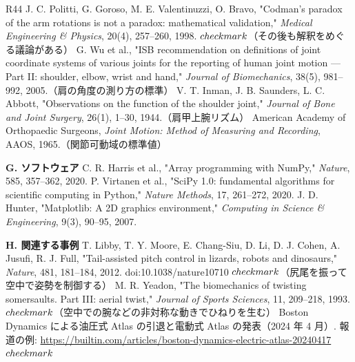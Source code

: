 \begin{thebibliography}{R44}
 J. C. Politti, G. Goroso, M. E. Valentinuzzi, O. Bravo, "Codman's paradox of the arm rotations is not a paradox: mathematical validation," \textit{Medical Engineering \& Physics}, 20(4), 257–260, 1998. $\\checkmark$（その後も解釈をめぐる議論がある）
 G. Wu et al., "ISB recommendation on definitions of joint coordinate systems of various joints for the reporting of human joint motion — Part II: shoulder, elbow, wrist and hand," \textit{Journal of Biomechanics}, 38(5), 981–992, 2005.（肩の角度の測り方の標準）
 V. T. Inman, J. B. Saunders, L. C. Abbott, "Observations on the function of the shoulder joint," \textit{Journal of Bone and Joint Surgery}, 26(1), 1–30, 1944.（肩甲上腕リズム）
 American Academy of Orthopaedic Surgeons, \textit{Joint Motion: Method of Measuring and Recording}, AAOS, 1965.（関節可動域の標準値）
\item[] \textbf{G. ソフトウェア}
 C. R. Harris et al., "Array programming with NumPy," \textit{Nature}, 585, 357–362, 2020.
 P. Virtanen et al., "SciPy 1.0: fundamental algorithms for scientific computing in Python," \textit{Nature Methods}, 17, 261–272, 2020.
 J. D. Hunter, "Matplotlib: A 2D graphics environment," \textit{Computing in Science \& Engineering}, 9(3), 90–95, 2007.
\item[] \textbf{H. 関連する事例}
 T. Libby, T. Y. Moore, E. Chang-Siu, D. Li, D. J. Cohen, A. Jusufi, R. J. Full, "Tail-assisted pitch control in lizards, robots and dinosaurs," \textit{Nature}, 481, 181–184, 2012. doi:10.1038/nature10710 $\\checkmark$（尻尾を振って空中で姿勢を制御する）
 M. R. Yeadon, "The biomechanics of twisting somersaults. Part III: aerial twist," \textit{Journal of Sports Sciences}, 11, 209–218, 1993. $\\checkmark$（空中での腕などの非対称な動きでひねりを生む）
 Boston Dynamics による油圧式 Atlas の引退と電動式 Atlas の発表（2024 年 4 月）. 報道の例: \url{https://builtin.com/articles/boston-dynamics-electric-atlas-20240417} $\\checkmark$
\end{thebibliography}
